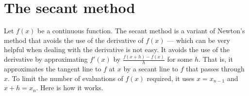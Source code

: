 \section{The secant method}\label{sec_C_4}
Let $f(x)$ be a continuous function. The secant method is a variant of 
Newton's method that avoids the use of the derivative of $f(x)$ --- which can be very helpful when dealing with the derivative is not easy. It avoids the use of the derivative  by approximating  $f'(x)$ by $\frac{f(x+h)-f(x)}{h}$ for some $h$. That is, it approximates the tangent line to $f$ at $x$ by a secant line 
to $f$ that passes through $x$. To limit the number of evaluations of $f(x)$ required, it uses $x=x_{n-1}$ and $x+h=x_n$. Here is how it works.

